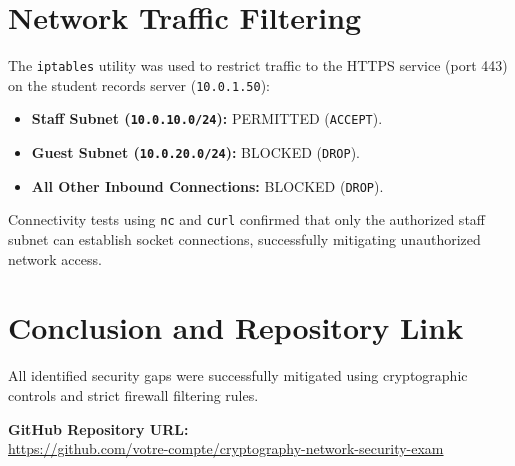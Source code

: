 \documentclass[12pt,a4paper]{article}
\begin{document}
\section{Network Traffic Filtering}
The \texttt{iptables} utility was used to restrict traffic to the HTTPS service (port 443) on the student records server (\texttt{10.0.1.50}):

\begin{itemize}
    \item \textbf{Staff Subnet (\texttt{10.0.10.0/24}):} PERMITTED (\texttt{ACCEPT}).
    \item \textbf{Guest Subnet (\texttt{10.0.20.0/24}):} BLOCKED (\texttt{DROP}).
    \item \textbf{All Other Inbound Connections:} BLOCKED (\texttt{DROP}).
\end{itemize}

Connectivity tests using \texttt{nc} and \texttt{curl} confirmed that only the authorized staff subnet can establish socket connections, successfully mitigating unauthorized network access.

\section{Conclusion and Repository Link}
All identified security gaps were successfully mitigated using cryptographic controls and strict firewall filtering rules.

\vspace{0.5cm}
\noindent \textbf{GitHub Repository URL:} \\
\url{https://github.com/votre-compte/cryptography-network-security-exam}
\end{document}
